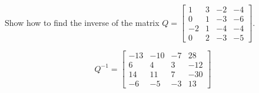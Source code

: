 
\begin{exerciseStatement}


Show how to find the inverse of the matrix \(Q= \left[\begin{array}{cccc}
1 & 3 & -2 & -4 \\
0 & 1 & -3 & -6 \\
-2 & 1 & -4 & -4 \\
0 & 2 & -3 & -5
\end{array}\right] \).


\end{exerciseStatement}
    
\begin{exerciseAnswer} 
\[Q^{-1}= \left[\begin{array}{cccc}
-13 & -10 & -7 & 28 \\
6 & 4 & 3 & -12 \\
14 & 11 & 7 & -30 \\
-6 & -5 & -3 & 13
\end{array}\right] \]
\end{exerciseAnswer}
    
